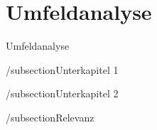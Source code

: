 \newpage

\section{Umfeldanalyse} \label{umfeldanalyse}
Umfeldanalyse

/subsection{Unterkapitel 1} \label{unterkapitel1}


/subsection{Unterkapitel 2} \label{unterkapitel2}


/subsection{Relevanz} \label{relevanz}

